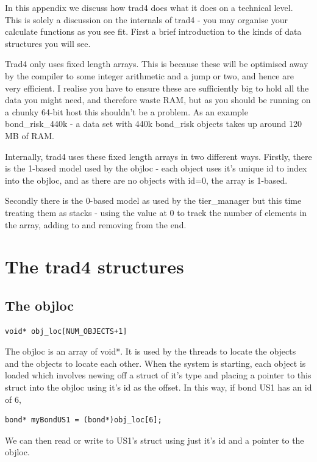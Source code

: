 \documentclass{report}
\begin{document}
In this appendix we discuss how trad4 does what it does on a technical level. This is solely a discussion on the internals of trad4 - you may organise your calculate functions as you see fit.  First a brief introduction to the kinds of data structures you will see. 

Trad4 only uses fixed length arrays. This is because these will be optimised away by the compiler to some integer arithmetic and a jump or two, and hence are very efficient. I realise you have to ensure these are sufficiently big to hold all the data you might need, and therefore waste RAM, but as you should be running on a chunky 64-bit host this shouldn't be a problem. As an example bond_risk_440k - a data set with 440k bond_risk objects takes up around 120 MB of RAM. 

Internally, trad4 uses these fixed length arrays in two different ways.  Firstly, there is the 1-based model used by the objloc - each object uses it's unique id to index into the objloc, and as there are no objects with id=0, the array is 1-based.

Secondly there is the 0-based model as used by the tier_manager but this time treating them as stacks - using the value at 0 to track the number of elements in the array, adding to and removing from the end.

\section{The trad4 structures}

\subsection{The objloc}

\begin{verbatim}
void* obj_loc[NUM_OBJECTS+1]
\end{verbatim}

The objloc is an array of void*. It is used by the threads to locate the objects and the objects to locate each other. When the system is starting, each object is loaded which involves newing off a struct of it's type and placing a pointer to this struct into the objloc using it's id as the offset.  In this way, if bond US1 has an id of 6,

\begin{verbatim}
bond* myBondUS1 = (bond*)obj_loc[6];
\end{verbatim}

We can then read or write to US1's struct using just it's id and a pointer to the objloc.
\end{document}
